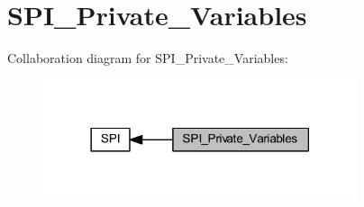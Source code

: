 \hypertarget{group___s_p_i___private___variables}{}\section{S\+P\+I\+\_\+\+Private\+\_\+\+Variables}
\label{group___s_p_i___private___variables}
Collaboration diagram for S\+P\+I\+\_\+\+Private\+\_\+\+Variables\+:
\nopagebreak
\begin{figure}[H]
\begin{center}
\leavevmode
\includegraphics[width=261pt]{group___s_p_i___private___variables}
\end{center}
\end{figure}

